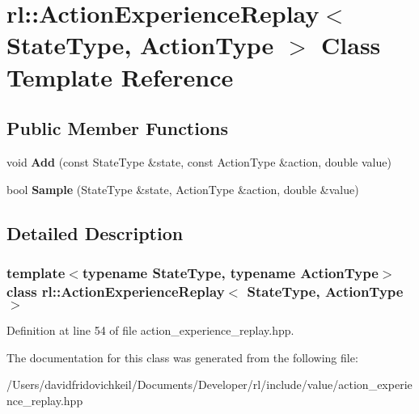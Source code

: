\hypertarget{classrl_1_1_action_experience_replay}{}\section{rl\+:\+:Action\+Experience\+Replay$<$ State\+Type, Action\+Type $>$ Class Template Reference}
\label{classrl_1_1_action_experience_replay}
\subsection*{Public Member Functions}
\begin{DoxyCompactItemize}
\item 
\hypertarget{classrl_1_1_action_experience_replay_a20fe9505bcc229211f7b67155ac42a95}{}\label{classrl_1_1_action_experience_replay_a20fe9505bcc229211f7b67155ac42a95} 
void {\bfseries Add} (const State\+Type \&state, const Action\+Type \&action, double value)
\item 
\hypertarget{classrl_1_1_action_experience_replay_a2e151b679b2b76ca712d17c716567b70}{}\label{classrl_1_1_action_experience_replay_a2e151b679b2b76ca712d17c716567b70} 
bool {\bfseries Sample} (State\+Type \&state, Action\+Type \&action, double \&value)
\end{DoxyCompactItemize}


\subsection{Detailed Description}
\subsubsection*{template$<$typename State\+Type, typename Action\+Type$>$\newline
class rl\+::\+Action\+Experience\+Replay$<$ State\+Type, Action\+Type $>$}



Definition at line 54 of file action\+\_\+experience\+\_\+replay.\+hpp.



The documentation for this class was generated from the following file\+:\begin{DoxyCompactItemize}
\item 
/\+Users/davidfridovichkeil/\+Documents/\+Developer/rl/include/value/action\+\_\+experience\+\_\+replay.\+hpp\end{DoxyCompactItemize}
